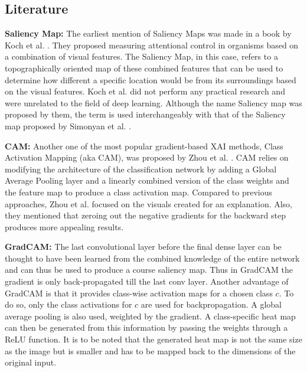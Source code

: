 \documentclass[a4paper,11pt,openright]{book}
\begin{document}
\subsection{Literature}
\textbf{Saliency Map: } The earliest mention of Saliency Maps was made in a book by Koch et al. \cite{adelmanSensorySystemVision2013a}. They proposed measuring attentional control in organisms based on a combination of visual features. The Saliency Map, in this case, refers to a topographically oriented map of these combined features that can be used to determine how different a specific location would be from its surroundings based on the visual features. Koch et al. did not perform any practical research and were unrelated to the field of deep learning. Although the name Saliency map was proposed by them, the term is used interchangeably with that of the Saliency map proposed by Simonyan et al. \cite{simonyanDeepConvolutionalNetworks2014}.

\textbf{CAM: } Another one of the most popular gradient-based XAI methods, Class Activation Mapping (aka CAM), was proposed by Zhou et al. \cite{zhouLearningDeepFeatures2016}. CAM relies on modifying the architecture of the classification network by adding a Global Average Pooling layer and a linearly combined version of the class weights and the feature map to produce a class activation map. Compared to previous approaches, Zhou et al. focused on the visuals created for an explanation. Also, they mentioned that zeroing out the negative gradients for the backward step produces more appealing results.

\textbf{GradCAM: } The last convolutional layer before the final dense layer can be thought to have been learned from the combined knowledge of the entire network and can thus be used to produce a course saliency map. Thus in GradCAM \cite{selvarajuGradCAMVisualExplanations} the gradient is only back-propagated till the last conv layer. Another advantage of GradCAM is that it provides class-wise activation maps for a chosen class $c$. To do so, only the class activations for $c$ are used for backpropagation. A global average pooling is also used, weighted by the gradient. A class-specific heat map can then be generated from this information by passing the weights through a ReLU function. It is to be noted that the generated heat map is not the same size as the image but is smaller and has to be mapped back to the dimensions of the original input.
\end{document}
